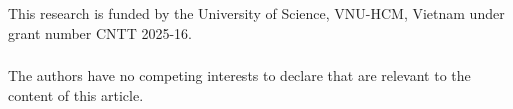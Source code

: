 \documentclass[runningheads]{llncs}
\begin{document}
\begin{credits}
  \subsubsection{\ackname} This research is funded by the University of Science, VNU-HCM, Vietnam under grant number CNTT 2025-16.

  \subsubsection{\discintname}
  The authors have no competing interests to declare that are
  relevant to the content of this article.
\end{credits}
%
%
%







\end{document}

